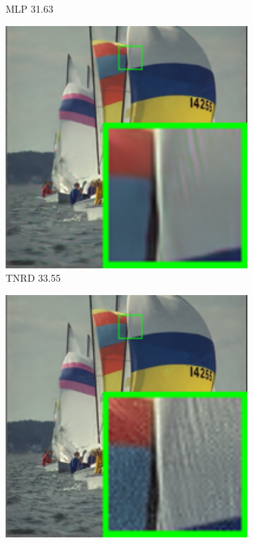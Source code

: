 \begin{figure}
\begin{subfigure}[t]{0.19\textwidth}
\caption{MLP 31.63}
    \end{subfigure}
    \hfill
    \begin{subfigure}[t]{0.19\textwidth}
        \centering
        \includegraphics[width=1\textwidth]{images/mcwnnm/24images/resize_br_TNRD_nSig53015_kodim09.png}
\caption{TNRD 33.55}
    \end{subfigure}
    \hfill
    \begin{subfigure}[t]{0.19\textwidth}
        \centering
        \includegraphics[width=1\textwidth]{images/mcwnnm/24images/resize_br_NC_nSig53015_kodim09.png}

\end{subfigure}
\end{figure}
